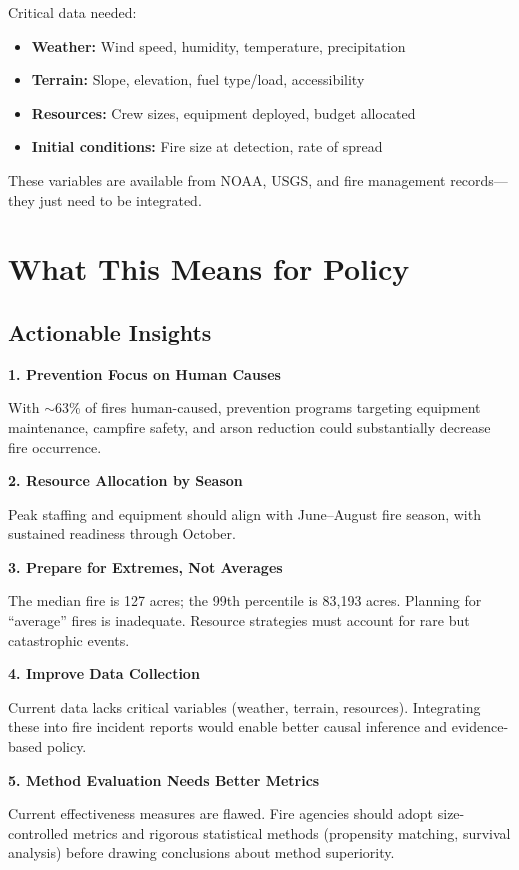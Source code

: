 \documentclass[11pt,a4paper]{article}
\begin{document}
Critical data needed:
\begin{itemize}
    \item \textbf{Weather:} Wind speed, humidity, temperature, precipitation
    \item \textbf{Terrain:} Slope, elevation, fuel type/load, accessibility
    \item \textbf{Resources:} Crew sizes, equipment deployed, budget allocated
    \item \textbf{Initial conditions:} Fire size at detection, rate of spread
\end{itemize}

These variables are available from NOAA, USGS, and fire management records---they just need to be integrated.

\section{What This Means for Policy}

\subsection{Actionable Insights}

\textbf{1. Prevention Focus on Human Causes}

With $\sim$63\% of fires human-caused, prevention programs targeting equipment maintenance, campfire safety, and arson reduction could substantially decrease fire occurrence.

\textbf{2. Resource Allocation by Season}

Peak staffing and equipment should align with June--August fire season, with sustained readiness through October.

\textbf{3. Prepare for Extremes, Not Averages}

The median fire is 127 acres; the 99th percentile is 83,193 acres. Planning for ``average'' fires is inadequate. Resource strategies must account for rare but catastrophic events.

\textbf{4. Improve Data Collection}

Current data lacks critical variables (weather, terrain, resources). Integrating these into fire incident reports would enable better causal inference and evidence-based policy.

\textbf{5. Method Evaluation Needs Better Metrics}

Current effectiveness measures are flawed. Fire agencies should adopt size-controlled metrics and rigorous statistical methods (propensity matching, survival analysis) before drawing conclusions about method superiority.
\end{document}
